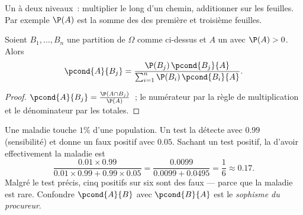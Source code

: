 \begin{omfigure}

{\small Un  à deux niveaux~: multiplier le long d'un chemin, additionner
sur les feuilles. Par exemple $\P(A)$ est la somme des  des
première et troisième feuilles.}
\end{omfigure}

\begin{theorem}\label{thm:g12:condprob:bayes}
Soient $B_1, \dots, B_n$ une partition de $\Omega$ comme ci-dessus et $A$
un  avec $\P(A) > 0$. Alors
\[
\pcond{A}{B_j} =
\frac{\P(B_j)\,\pcond{B_j}{A}}{\sum_{i=1}^{n} \P(B_i)\,\pcond{B_i}{A}} .
\]
\end{theorem}

\begin{proof}
$\pcond{A}{B_j} = \frac{\P(A \cap B_j)}{\P(A)}$~;  le numérateur
par la règle de multiplication et le dénominateur par les 
totales.
\end{proof}

\begin{example}\label{ex:g12:condprob:test}
Une maladie touche $1\%$ d'une population. Un test la détecte avec
 $0.99$ (sensibilité) et donne un faux positif avec 
$0.05$. Sachant un test positif, la  d'avoir effectivement la
maladie est
\[
\frac{0.01 \times 0.99}{0.01\times0.99 + 0.99\times0.05}
= \frac{0.0099}{0.0099 + 0.0495} = \frac{1}{6} \approx 0.17 .
\]
Malgré le test précis, cinq positifs sur six sont des faux --- parce que la
maladie est rare. Confondre $\pcond{A}{B}$ avec $\pcond{B}{A}$ est le
\emph{sophisme du procureur}.
\end{example}

